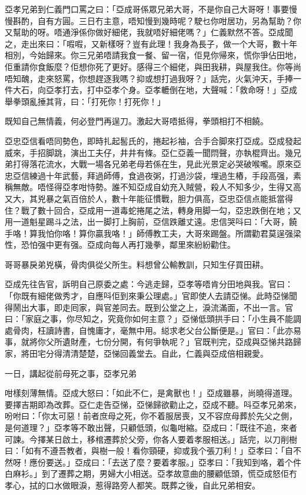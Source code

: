 \documentclass[a5paper, 12pt, openany]{book} %
\begin{document}
	亞孝兄弟到仁義門口罵之曰：「亞成哥係眾兄弟大哥，不是你自己大哥呀！事要慢慢斟酌，自有方圓。三日冇主意，唔知慢到幾時呢？駛乜你咁居功，另為幫助？你又幫助的呀。唔通淨係你做好細佬，我就唔好細佬嗎？」仁義默然不答。亞成聞之，走出來曰：「㗇㗇，又新樣呀？豈有此理！我身為長子，做一个大哥，數十年相別，今始歸來。你三兄弟唔請我食一餐、留一宿，佢見你帰來，慌你爭佔田地，佢重請你食飯麼？佢想你死了更好。感得三个細佬，與田我耕，與屋我住。你等尚唔知醜，走來怒罵，你想趕逐我嗎？抑或想打過我呀？」話完，火氣沖天，手捧一件大石，向亞孝打去，打中亞孝个身。亞孝轆倒在地，大聲喊：「救命呀！」亞成舉拳頭亂捶其背，曰：「打死你！打死你！」

	既知自己無情義，何必登門再逞刀。激起大哥唔抵得，拳頭相打不相饒。

	亞忠亞信看唔同勢色，即時扎起䯻氏的，捲起衫袖，合手合脚來打亞成。亞成發起威來，手招脚跳，演出工夫仔，井井有條。亞仁亞義一聞𨳒聲，亦執棍齊出。幾兄弟打得落花流水，大戰一場各兄弟老母若係在生，見此光景定必哭破喉嚨。原來亞忠亞信練過十年武藝，拜過師傅，食過夜粥，打過沙袋，埋過生樁，手段高强，素稱無敵。唔怪得亞孝咁恃勢。誰不知亞成自幼充入賊營，殺人不知多少，生得又高又大，其兇暴之氣百倍於人，數十年能征慣戰，胆力俱高，亞忠亞信点能抵當得住？戰了數十回合，亞成用一道毒蛇捲尾之法，轉身用脚一勾，亞忠跌倒在地；又用一道魁星踢斗之法，出一脚打上胸前，亞信跌離丈遠。忠信哭呌曰：「大哥，饒手咯！算我怕你咯！算你贏我咯！」師傅教工夫，大哥來踢盤。所謂勸君莫逞强梁性，恐怕强中更有强。亞成向每人再打幾拳，鄰里來紛紛勸住。

	哥哥暴戾弟兇橫，骨肉俱從父所生。料想曾公輸教訓，只知生仔買田耕。

	亞成先往告官，訴明自己原委之處：今逃走歸，亞孝等唔肯分田地與我。官曰：「你既有細佬做秀才，自應呌佢到來秉公理處。」官即使人去請亞悌。此時亞悌聞得鬧出大事，即走囘家，與官差同去。既到公堂之上，淚流滿面，不出一言。官曰：「家庭之事，你尽知之，究竟你如何主意？」亞悌低頭拱手曰：「小生員不能調處骨肉，枉讀詩書，自愧庸才，毫無中用。縂求老父台公斷便是。」官曰：「此亦易事，就將你父所遺財產，七份分開，有何爭執呢？」官既判完，亞成與亞悌共路歸家，將田宅分得清清楚楚，亞悌回義堂去。自此，仁義與亞成倍相親愛。

	一日，講起從前母死之事，亞孝兄弟

	咁樣刻薄無情。亞成大怒曰：「如此不仁，是禽獸也！」亞成雖暴，尚曉得道理。要擇吉期即為改葬。亞仁走告亞悌，亞悌歸欲勸止之，亞成不聽。呌亞孝兄弟來，吩咐曰：「你太可惡！前者庶母之死，你不着服居喪，又不容庶母葬於先父之側，是何道理？」亞孝等不敢出聲，只顧低頭，似龜咁縮。亞成曰：「既往不追，來者可諫。今擇某日啟土，移棺遷葬於父旁，你各人要着孝服相送。」話完，以刀削樹曰：「如有不遵吾教者，與樹一般！看你頸硬，抑或我个張刀利！」亞孝曰：「自不然呀！應份要送。」亞成曰：「去送了麼？要着孝服。」亞孝曰：「我知到咯，着个件白麻衫。」到了遷葬之期，男婦大小相送。亞孝故意曲的腰顧低頭，慌亞成怒佢冇孝心，拭的口水做眼淚，惹得路旁人都笑。既葬之後，自此兄弟相安。
\end{document}
